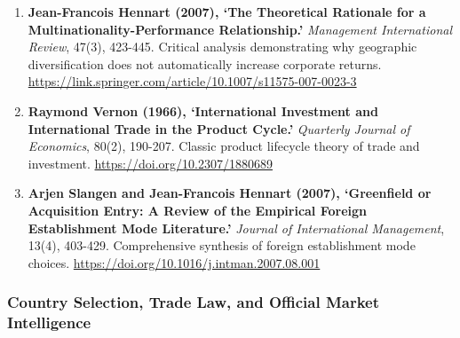 \begin{enumerate}
    \item \textbf{Jean-Francois Hennart (2007), `The Theoretical Rationale for a Multinationality-Performance Relationship.'} \textit{Management International Review}, 47(3), 423-445. Critical analysis demonstrating why geographic diversification does not automatically increase corporate returns. \url{https://link.springer.com/article/10.1007/s11575-007-0023-3}
    \item \textbf{Raymond Vernon (1966), `International Investment and International Trade in the Product Cycle.'} \textit{Quarterly Journal of Economics}, 80(2), 190-207. Classic product lifecycle theory of trade and investment. \url{https://doi.org/10.2307/1880689}
    \item \textbf{Arjen Slangen and Jean-Francois Hennart (2007), `Greenfield or Acquisition Entry: A Review of the Empirical Foreign Establishment Mode Literature.'} \textit{Journal of International Management}, 13(4), 403-429. Comprehensive synthesis of foreign establishment mode choices. \url{https://doi.org/10.1016/j.intman.2007.08.001}
\end{enumerate}

\subsubsection*{Country Selection, Trade Law, and Official Market Intelligence}

